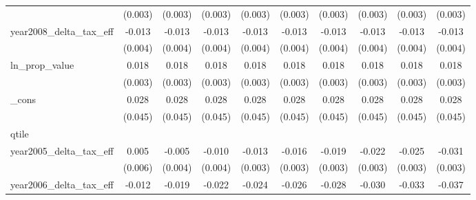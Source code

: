 {\begin{tabular}{l*{9}{c}}
            &     (0.003)         &     (0.003)         &     (0.003)         &     (0.003)         &     (0.003)         &     (0.003)         &     (0.003)         &     (0.003)         &     (0.003)         \\
[1em]
year2008_delta_tax_eff&      -0.013\sym{***}&      -0.013\sym{***}&      -0.013\sym{***}&      -0.013\sym{***}&      -0.013\sym{***}&      -0.013\sym{***}&      -0.013\sym{***}&      -0.013\sym{***}&      -0.013\sym{***}\\
            &     (0.004)         &     (0.004)         &     (0.004)         &     (0.004)         &     (0.004)         &     (0.004)         &     (0.004)         &     (0.004)         &     (0.004)         \\
[1em]
ln_prop_value&       0.018\sym{***}&       0.018\sym{***}&       0.018\sym{***}&       0.018\sym{***}&       0.018\sym{***}&       0.018\sym{***}&       0.018\sym{***}&       0.018\sym{***}&       0.018\sym{***}\\
            &     (0.003)         &     (0.003)         &     (0.003)         &     (0.003)         &     (0.003)         &     (0.003)         &     (0.003)         &     (0.003)         &     (0.003)         \\
[1em]
_cons       &       0.028         &       0.028         &       0.028         &       0.028         &       0.028         &       0.028         &       0.028         &       0.028         &       0.028         \\
            &     (0.045)         &     (0.045)         &     (0.045)         &     (0.045)         &     (0.045)         &     (0.045)         &     (0.045)         &     (0.045)         &     (0.045)         \\
\hline
qtile       &                     &                     &                     &                     &                     &                     &                     &                     &                     \\
year2005_delta_tax_eff&       0.005         &      -0.005         &      -0.010\sym{***}&      -0.013\sym{***}&      -0.016\sym{***}&      -0.019\sym{***}&      -0.022\sym{***}&      -0.025\sym{***}&      -0.031\sym{***}\\
            &     (0.006)         &     (0.004)         &     (0.004)         &     (0.003)         &     (0.003)         &     (0.003)         &     (0.003)         &     (0.003)         &     (0.003)         \\
[1em]
year2006_delta_tax_eff&      -0.012\sym{*}  &      -0.019\sym{***}&      -0.022\sym{***}&      -0.024\sym{***}&      -0.026\sym{***}&      -0.028\sym{***}&      -0.030\sym{***}&      -0.033\sym{***}&      -0.037\sym{***}\\

\end{tabular}}
